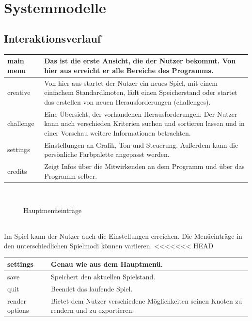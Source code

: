 \chapter{Systemmodelle}


\section{Interaktionsverlauf}

	\begin{longtable}{|p{}|p{}|}
    \hline
    main menu & Das ist die erste Ansicht, die der Nutzer bekommt. Von hier aus erreicht er alle Bereiche des Programms.\\
    \hline
    creative & Von hier aus startet der Nutzer ein neues Spiel, mit einem einfachem Standardknoten, lädt einen Speicherstand oder startet das erstellen von neuen Herausforderungen (challenges).\\
    \hline
    challenge & Eine Übersicht, der vorhandenen Herausforderungen. Der Nutzer kann nach verschieden Kriterien suchen und sortieren lassen und in einer Vorschau weitere Informationen betrachten.\\
    \hline
    settings & Einstellungen an Grafik, Ton und Steuerung. Außerdem kann die persönliche Farbpalette angepasst werden.\\
    \hline
    credits & Zeigt Infos über die Mitwirkenden an dem Programm und über das Programm selber.\\
    \hline
    
   \end{longtable}
   
   ~\\
    
	\begin{figure}[h]
		\centering
	 	
	 	\caption{Hauptmenüeinträge}
	\end{figure}
	
	\clearpage
	~\\
	
	Im Spiel kann der Nutzer auch die {\color{red} Einstellungen} erreichen. Die Menüeinträge in den unterschiedlichen Spielmodi können variieren.
<<<<<<< HEAD
		
	\begin{longtable}{|p{}|p{}|}
	
	\hline
	settings & Genau wie aus dem Hauptmenü.\\
	\hline
	save & Speichert den aktuellen Spielstand.\\
	\hline
	quit & Beendet das laufende Spiel. \\
	\hline
	render options & Bietet dem Nutzer verschiedene Möglichkeiten seinen Knoten zu rendern und zu exportieren.\\
	\hline
	
	\end{longtable}
	
